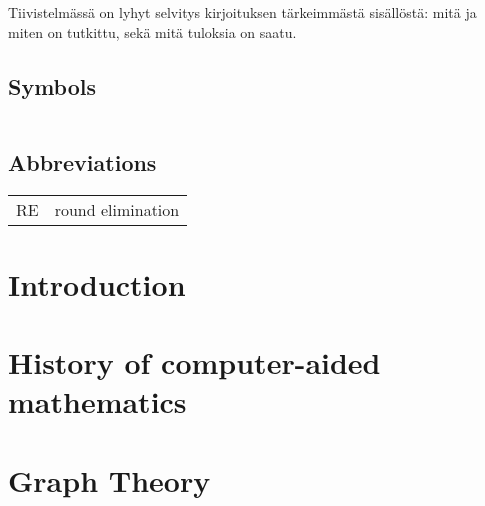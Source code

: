 \documentclass[english, 12pt, a4paper, sci, utf8, a-1b, online]{aaltothesis}
\date{2021}
\begin{document}
\makecoverpage{}

\makecopyrightpage{}

\begin{abstractpage}[english]
  \abstracttext{}
\end{abstractpage}

\newpage


\begin{abstractpage}[finnish]
  Tiivistelmässä on lyhyt selvitys
  kirjoituksen tärkeimmästä sisällöstä: mitä ja miten on tutkittu,
  sekä mitä tuloksia on saatu. 
\end{abstractpage}

\thesistableofcontents{}



\newcommand{\reline}[1]{\textbf{#1}}

\subsection*{Symbols}

\begin{tabular}{ll}
\end{tabular}

\subsection*{Abbreviations}

\begin{tabular}{ll}
RE         & round elimination
\end{tabular}

\cleardoublepage{}
\section{Introduction}

\thispagestyle{empty}

\clearpage
\section{History of computer-aided mathematics}

\section{Graph Theory}
\end{document}

